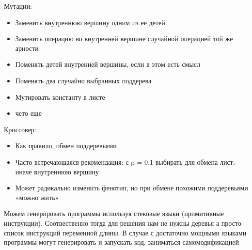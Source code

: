 Мутации:
\begin{itemize}
Заменить поддерево случайно сгенерированным деревом
	\item Заменить внутреннюю вершину одним из ее детей
	\item Заменить операцию во внутренней вершине случайной операцией той же арности
	\item Поменять детей внутренней вершины, если в этом есть смысл
	\item Поменять два случайно выбранных поддерева
	\item Мутировать константу в листе
	\item чето еще
\end{itemize}
Кроссовер:
\begin{itemize}
	\item Как правило, обмен поддеревьями
	\item Часто встречающаяся рекомендация: с p = 0.1 выбирать для обмена лист, иначе внутреннюю вершину
	\item Может радикально изменить фенотип, но при обмене похожими поддеревьями «можно жить»
\end{itemize}
Можем генерировать программы используя стековые языки (примитивные инструкции). 
Соотвественно тогда для решения нам не нужны деревья а просто список инструкций переменной длины. 
В случае с достаточно мощными языками программы могут генерировать и запускать код, заниматься самомодификацией
